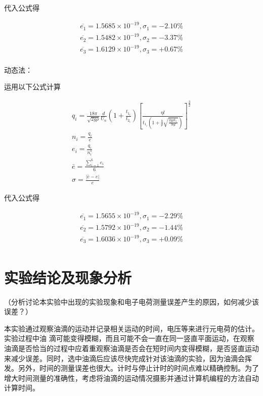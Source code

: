 \documentclass[signature=data]{physicsreport}
\begin{document}
代入公式得

$$
\begin{array}{c}
\overline{e_1}=1.5685×10^{-19},\sigma_1=-2.10\% \\
\overline{e_2}=1.5482×10^{-19},\sigma_2=-3.37\% \\
\overline{e_3}=1.6129×10^{-19},\sigma_3=+0.67\% \\
\end{array}
$$

动态法：

运用以下公式计算

$$
\begin{array}{c}
q_{i}=\frac{18 \pi}{\sqrt{2 g \rho}} \frac{d}{U_{n}}\left(1+\frac{t_{1_{i}}}{t_{2_{i}}}\right)\left[\frac{\eta l}{t_{1_{i}}\left(1+\frac{b}{p} \sqrt{\frac{2 g \rho t_{1_{i}}}{9 \eta l}}\right)}\right]^{\frac{3}{2}} \\ 
n_{i}=\frac{q_{i}}{e} \\
e_{i}=\frac{q_{i}}{n_{i}^{*}} \\
\bar{e}=\frac{\sum_{i=1}^{6} e_{i}}{6} \\
\sigma=\frac{|\bar{e}-e|}{e}
\end{array}
$$

代入公式得

$$
\begin{array}{c}
\overline{e_1}=1.5655×10^{-19},\sigma_1=-2.29\% \\
\overline{e_2}=1.5792×10^{-19},\sigma_2=-1.44\% \\
\overline{e_3}=1.6036×10^{-19},\sigma_3=+0.09\% \\
\end{array}
$$

\section{实验结论及现象分析}
    （分析讨论本实验中出现的实验现象和电子电荷测量误差产生的原因，如何减少该误差？）

    本实验通过观察油滴的运动并记录相关运动的时间，电压等来进行元电荷的估计。实验过程中油
滴可能变得模糊，而且可能不会一直在同一竖直平面运动，在观察油滴是否恰当的过程中应着重观察油滴是否会在短时间内变得模糊，是否竖直运动来减少误差。同时，选中油滴后应该尽快完成针对该油滴的实验，因为油滴会挥发。另外，时间的测量误差也很大。计时与停止计时的时间点难以精确控制。为了增大时间测量的准确性，考虑将油滴的运动情况摄影并通过计算机编程的方法自动计算时间。
    \vspace{10em}
\end{document}

